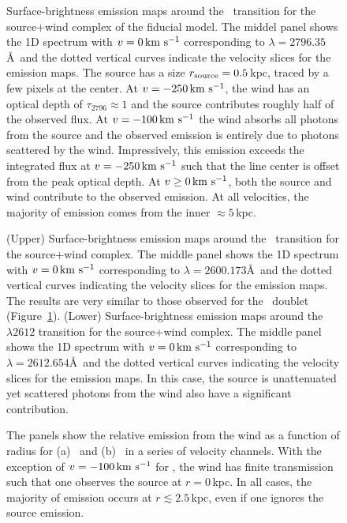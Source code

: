 \documentclass[12pt,preprint]{aastex}
\begin{document}
\begin{figure}
\caption{
Surface-brightness emission maps around the \mgiia\ transition for the
source+wind complex of the fiducial model.  The middel panel shows the 1D spectrum with $v=0
\, {\rm km~s^{-1}}$ corresponding to $\lambda = 2796.35$\AA\ and the dotted vertical
curves indicate the velocity slices for the emission maps.  The
source has a size $r_{\rm source} = 0.5$\,kpc, traced by a few
pixels at the center.   At $v=-250 \, {\rm km~s^{-1}}$, the wind has an optical
depth of $\tau_{2796} \approx 1$ and the source contributes
roughly half of the observed flux.  At $v=-100 \, {\rm km~s^{-1}}$ the
wind absorbs all photons from the source and the observed emission is
entirely due to photons scattered by the wind.  Impressively, this
emission exceeds the integrated flux at $v = -250\, {\rm km~s^{-1}}$ such that the
line center is offset from the peak optical depth.  At $v \ge 0
\, {\rm km~s^{-1}}$,  both the source and wind contribute to the observed emission.
At all velocities, the majority of emission comes from the inner
$\approx 5$\,kpc.
}
\label{fig:fiducial_ifu_mgii}
\end{figure}

\begin{figure}
\caption{
(Upper) Surface-brightness emission maps around the \feiib\ transition for the
source+wind complex.  The middle panel shows the 1D spectrum with $v=0
\, {\rm km~s^{-1}}$ corresponding to $\lambda = 2600.173$\AA\ and the dotted vertical
curves indicating the velocity slices for the emission maps.  
The results are very similar to those observed for the \mgiid\ doublet
(Figure~\ref{fig:fiducial_ifu_mgii}).
(Lower) Surface-brightness emission maps around the ~$\lambda
2612$ transition for the 
source+wind complex.  The middle panel shows the 1D spectrum with $v=0
\, {\rm km~s^{-1}}$ corresponding to $\lambda = 2612.654$\AA\ and the dotted vertical
curves indicating the velocity slices for the emission maps.  
In this case, the source is unattenuated yet scattered photons from
the wind also have a significant contribution. 
}
\label{fig:fiducial_ifu_feii}
\end{figure}

\begin{figure}
\caption{
The panels show the relative emission from the wind as a function of
radius for (a) \mgiia\ and (b) \feiib\ in a series of velocity
channels.  With the exception of $v = -100 \, {\rm km~s^{-1}}$ for \mgiia, the wind
has finite transmission such that one observes the source at $r =
0$\,kpc.  In all cases,  the majority of emission occurs at $r
\lesssim 2.5$\,kpc, even if one ignores the source emission.
}
\label{fig:fiducial_cuts}
\end{figure}
\end{document}
